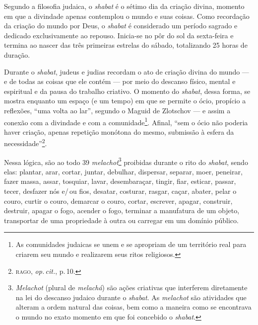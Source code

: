 \noindent{}Segundo a filosofia judaica, o \emph{shabat} é o sétimo dia da criação
divina, momento em que a divindade apenas contemplou o mundo e suas
coisas. Como recordação da criação do mundo por Deus, o \emph{shabat} é
considerado um período sagrado e dedicado exclusivamente ao repouso.
Inicia-se no pôr do sol da sexta-feira e termina ao nascer das três
primeiras estrelas do sábado, totalizando 25 horas de duração.

Durante o \emph{shabat}, judeus e judias recordam o ato de criação
divina do mundo --- e de todas as coisas que ele contém --- por meio do
descanso físico, mental e espiritual e da pausa do trabalho criativo. O
momento do \emph{shabat}, dessa forma, se mostra enquanto um espaço (e
um tempo) em que se permite o ócio, propício a reflexões, ``uma
volta ao lar'', segundo o Maguid de Zlotschov --- e assim a conexão com
a divindade e com a comunidade\footnote{As comunidades judaicas se unem
  e se apropriam de um território real para criarem seu mundo e
  realizarem seus ritos religiosos.}. Afinal, ``sem o ócio não
poderia haver criação, apenas repetição monótona do mesmo, submissão à
esfera da necessidade''\footnote{\textsc{rago}, \emph{op.\,cit.}, p.\,10.}.

Nessa lógica, são ao todo 39 \emph{melachot}\footnote{\emph{Melachot}
  (plural de \emph{melachá}) são ações criativas que interferem
  diretamente na lei do descanso judaico durante o \emph{shabat}. As
  \emph{melachot} são atividades que alteram a ordem natural das coisas,
  bem como a maneira como se encontrava o mundo no exato momento em que
  foi concebido o \emph{shabat}.} proibidas durante o rito do
\emph{shabat}, sendo elas: plantar, arar, cortar, juntar, debulhar,
dispersar, separar, moer, peneirar, fazer massa, assar, tosquiar, lavar,
desembaraçar, tingir, fiar, esticar, passar, tecer, desfazer nós e/\,ou
fios, desatar, costurar, rasgar, caçar, abater, pelar o couro, curtir o
couro, demarcar o couro, cortar, escrever, apagar, construir, destruir,
apagar o fogo, acender o fogo, terminar a manufatura de um objeto,
transportar de uma propriedade à outra ou carregar em um domínio
público.


